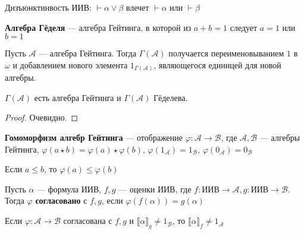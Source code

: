 \documentclass[12pt, a4paper, oneside]{book}
\begin{document}
\begin{definition}
    Дизъюнктинвость ИИВ: \(\vdash \alpha \lor \beta\) влечет \(\vdash \alpha\) или \(\vdash \beta\)
\end{definition}

\begin{definition}
    \textbf{Алгебра Гёделя} --- алгебра Гейтинга, в которой из \(a + b = 1\) следует \(a = 1\) или \(b = 1\)
\end{definition}

\begin{definition}
    Пусть \(\mathcal{A}\) --- алгебра Гейтинга. Тогда \(\Gamma(\mathcal{A})\) получается переименовыванием \(1\) в \(\omega\) и добавлением нового элемента \(1_{\Gamma(\mathcal{A})}\), являющегося единицей для новой алгебры.
\end{definition}

\begin{theorem}
    \(\Gamma(\mathcal{A})\) есть алгебра Гейтинга и \(\Gamma(\mathcal{A})\) Гёделева.
\end{theorem}

\begin{proof}
    Очевидно.
\end{proof}

\begin{definition}
    \textbf{Гомоморфизм алгебр Гейтинга} --- отображение \(\varphi : \mathcal{A} \to \mathcal{B}\), где \(\mathcal{A}, \mathcal{B}\) --- алгебры Гейтинга, \(\varphi(a \star b) = \varphi(a) \star \varphi(b)\), \(\varphi(1_{\mathcal{A}}) = 1_{\mathcal{B}}\), \(\varphi(0_{\mathcal{A}}) = 0_{\mathcal{B}}\)
\end{definition}

\begin{theorem}
    Если \(a \leq b\), то \(\varphi(a) \leq \varphi(b)\)
\end{theorem}

\begin{definition}
    Пусть \(\alpha\) --- формула ИИВ, \(f, g\) --- оценки ИИВ, где \(f : \text{ИИВ} \to \mathcal{A}, g : \text{ИИВ} \to \mathcal{B}\). Тогда \(\varphi\) \textbf{согласовано} с \(f, g\), если \(\varphi(f(\alpha)) = g(\alpha)\)
\end{definition}

\begin{theorem}
    Если \(\varphi : \mathcal{A} \to \mathcal{B}\) согласована с \(f, g\) и \(\llbracket \alpha \rrbracket_g \neq 1_{\mathcal{B}}\), то \(\llbracket \alpha \rrbracket_f \neq 1_{\mathcal{A}}\)
\end{theorem}
\end{document}
